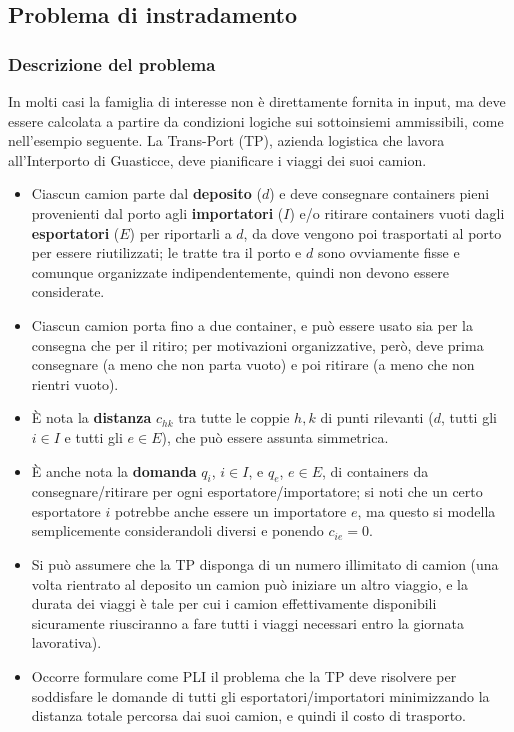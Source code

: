 \documentclass[12pt,a4paper]{article}
\begin{document}
\subsection{Problema di instradamento}
\subsubsection{Descrizione del problema}
In molti casi la famiglia di interesse non è direttamente fornita in input, ma deve essere calcolata a partire da
condizioni logiche sui sottoinsiemi ammissibili, come nell’esempio seguente.
La Trans-Port (TP), azienda logistica che lavora all’Interporto di Guasticce, deve pianificare i viaggi dei suoi
camion.
\begin{itemize}
    \item Ciascun camion parte dal \textbf{deposito} ($d$) e deve consegnare containers pieni provenienti dal porto agli
    \textbf{importatori} ($I$) e/o ritirare containers vuoti dagli \textbf{esportatori} ($E$) per riportarli a $d$, da dove vengono poi
    trasportati al porto per essere riutilizzati; le tratte tra il porto e $d$ sono ovviamente fisse e comunque
    organizzate indipendentemente, quindi non devono essere considerate.
    \item Ciascun camion porta fino a due container, e può essere usato sia per la consegna che per il ritiro; per
    motivazioni organizzative, però, deve prima consegnare (a meno che non parta vuoto) e poi ritirare (a meno
    che non rientri vuoto).
    \item È nota la \textbf{distanza} $c_{hk}$ tra tutte le coppie ${h,k}$ di punti rilevanti ($d$, tutti gli $i \in I$ e tutti gli $e \in E$), che può essere assunta simmetrica.
    \item È anche nota la \textbf{domanda} $q_i$, $i \in I$, e $q_e$, $e \in E$, di containers da consegnare/ritirare per ogni esportatore/importatore; si noti che un certo esportatore $i$ potrebbe anche essere un importatore $e$, ma questo si modella semplicemente considerandoli diversi e ponendo $c_{ie}=0$.
    \item Si può assumere che la TP disponga di un numero illimitato di camion (una volta rientrato al deposito un camion può iniziare un altro viaggio, e la durata dei viaggi è tale per cui i camion effettivamente disponibili sicuramente riusciranno a fare tutti i viaggi necessari entro la giornata lavorativa).
    \item Occorre formulare come PLI il problema che la TP deve risolvere per soddisfare le domande di tutti gli esportatori/importatori minimizzando la distanza totale percorsa dai suoi camion, e quindi il costo di trasporto.
\end{itemize}
\end{document}
